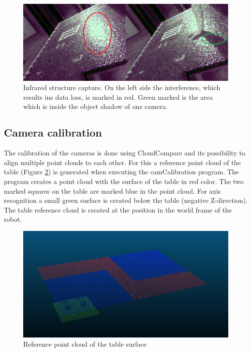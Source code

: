 \begin{figure}[H]                                      
	\centering\includegraphics[scale=0.5]{images/Infrared.png}			
	\caption{Infrared structure capture. On the left side the interference, which results ins data loss, is marked in red. Green marked is the area which is inside the object shadow of one camera.}
	\label{fig:infrared}                      
\end{figure}

\subsection{Camera calibration}
\label{subsec:camcalib}
The calibration of the cameras is done using CloudCompare and its possibility to align multiple point clouds to each other. For this a reference point cloud of the table (Figure \ref{fig:refpctable}) is generated when executing the camCalibration program. The program creates a point cloud with the surface of the table in red color. The two marked squares on the table are marked blue in the point cloud. For axis recognition a small green surface is created below the table (negative Z-direction). The table reference cloud is created at the position in the world frame of the robot.

\begin{figure}[H]                                      
	\centering\includegraphics[scale=0.5]{images/CC_tableref.jpeg}			
	\caption{Reference point cloud of the table surface}
	\label{fig:refpctable}                      
\end{figure}

